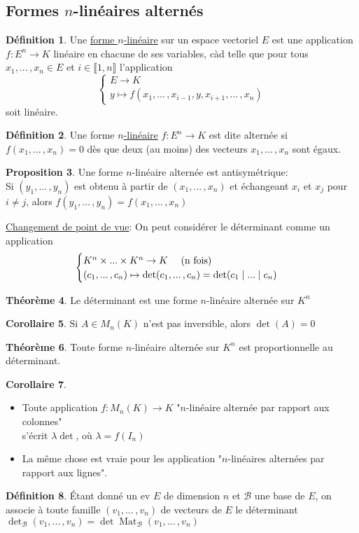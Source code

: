 \documentclass[10pt,a4paper]{article}
\theoremstyle{definition}
\newtheorem{proposition}{Proposition}[section]
\newtheorem{theorem}[proposition]{Théorème}
\newtheorem{corollaire}[proposition]{Corollaire}
\newtheorem{definition}[proposition]{Définition}
\DeclareMathOperator{\mat}{Mat}
\begin{document}
\subsection{Formes $n$-linéaires alternés}
\begin{definition}
Une \uline{forme $n$-linéaire} sur un espace vectoriel $E$ est une application $f: E^n \to K$ linéaire en chacune de ses variables, càd telle que pour tous $x_1, ...\,, x_n \in E$ et $i \in \llbracket 1, n \rrbracket$ l'application 
\[\begin{cases}
E \to K \\
y \mapsto f(x_1, ...\,, x_{i - 1}, y, x_{i + 1}, ...\,, x_n)
\end{cases}\]
soit linéaire.
\end{definition}
\begin{definition}
Une forme \uline{$n$-linéaire} $f: E^n \to K$ est dite alternée si $f(x_1, ...\,, x_n) = 0$ dès que deux (au moins) des vecteurs $x_1, ...\,, x_n$ sont égaux.
\end{definition}
\begin{proposition}
Une forme $n$-linéaire alternée est antisymétrique: \\
Si $(y_1, ...\,, y_n)$ est obtenu à partir de $(x_1, ...\,, x_n)$ et échangeant $x_i$ et $x_j$ pour $i \neq j$, alors $f(y_1, ...\,, y_n) = f(x_1, ...\,, x_n)$
\end{proposition}
\noindent \uline{Changement de point de vue}: On peut considérer le déterminant comme un application
\[ \begin{cases}
K^n \times ... \times K^n \to K \text{ \quad (n fois) } \\
(c_1, ...\,, c_n) \mapsto \det(c_1, ...\,, c_n) = \det(c_1 \mid ... \mid c_n)
\end{cases}\]
\begin{theorem}
Le déterminant est une forme $n$-linéaire alternée sur $K^n$
\end{theorem}
\begin{corollaire}
Si $A \in M_n(K)$ n'est pas inversible, alors $\det(A) = 0$
\end{corollaire}
\begin{theorem}
Toute forme $n$-linéaire alternée sur $K^n$ est proportionnelle au déterminant.
\end{theorem}
\begin{corollaire}
\hfill
\begin{itemize}
\item Toute application $f: M_n(K) \to K$ "$n$-linéaire alternée par rapport aux colonnes" \\
s'écrit $\lambda \det$, où $\lambda = f(I_n)$
\item La même chose est vraie pour les application "$n$-linéaires alternées par rapport aux lignes".
\end{itemize}
\end{corollaire}
\begin{definition}
Étant donné un ev $E$ de dimension $n$ et $\mathcal{B}$ une base de $E$, on associe à toute famille $(v_1, ...\,, v_n)$ de vecteurs de $E$ le déterminant $\det_\mathcal{B} (v_1, ...\,, v_n) = \det \mat_\mathcal{B} (v_1, ...\,, v_n)$
\end{definition}
\end{document}
